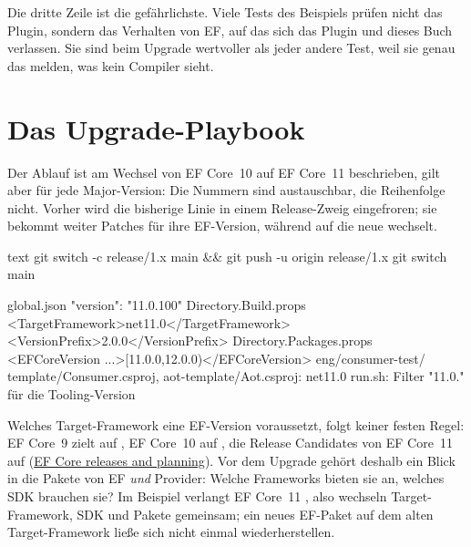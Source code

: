 Die dritte Zeile ist die gefährlichste. Viele Tests des Beispiels prüfen nicht das Plugin,
sondern das Verhalten von EF, auf das sich das Plugin und dieses Buch verlassen. Sie sind
beim Upgrade wertvoller als jeder andere Test, weil sie genau das melden, was kein Compiler
sieht.

\section{Das Upgrade-Playbook}

Der Ablauf ist am Wechsel von EF Core~10 auf EF Core~11 beschrieben, gilt aber für jede
Major-Version: Die Nummern sind austauschbar, die Reihenfolge nicht. Vorher wird die
bisherige Linie in einem Release-Zweig eingefroren; sie bekommt weiter Patches für ihre
EF-Version, während  auf die neue wechselt.

\begin{sourcecode}{text}
git switch -c release/1.x main && git push -u origin release/1.x
git switch main

global.json               "version": "11.0.100"
Directory.Build.props     <TargetFramework>net11.0</TargetFramework>
                          <VersionPrefix>2.0.0</VersionPrefix>
Directory.Packages.props  <EFCoreVersion ...>[11.0.0,12.0.0)</EFCoreVersion>
eng/consumer-test/        template/Consumer.csproj, aot-template/Aot.csproj: net11.0
                          run.sh: Filter "11.0." für die Tooling-Version
\end{sourcecode}

Welches Target-Framework eine EF-Version voraussetzt, folgt keiner festen Regel: EF Core~9
zielt auf , EF Core~10 auf , die
Release Candidates von EF Core~11 auf 
(\href{https://learn.microsoft.com/en-us/ef/core/what-is-new/}{EF Core releases and planning}). Vor dem Upgrade gehört deshalb ein Blick in
die Pakete von EF \emph{und} Provider: Welche Frameworks bieten sie an, welches SDK
brauchen sie? Im Beispiel verlangt EF Core~11 , also wechseln
Target-Framework, SDK und Pakete gemeinsam; ein neues EF-Paket auf dem alten
Target-Framework ließe sich nicht einmal wiederherstellen.

